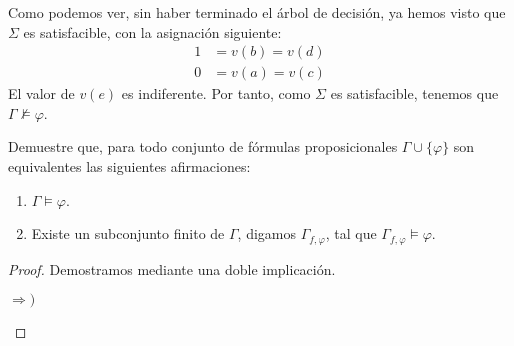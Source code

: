 \documentclass[12pt]{article}
\begin{document}
\begin{ejercicio}
    Como podemos ver, sin haber terminado el árbol de decisión, ya hemos visto que
    $\Sigma$ es satisfacible, con la asignación siguiente:
    \begin{align*}
        1 &= v(b) = v(d) \\
        0 &= v(a) = v(c)
    \end{align*}
    El valor de $v(e)$ es indiferente. Por tanto, como
    $\Sigma$ es satisfacible, tenemos que $\Gamma \not\models \varphi$.
\end{ejercicio}

\begin{ejercicio}
    Demuestre que, para todo conjunto de fórmulas proposicionales $\Gamma\cup \{\varphi\}$ son
    equivalentes las siguientes afirmaciones:
    \begin{enumerate}
        \item $\Gamma \models \varphi$.
        \item Existe un subconjunto finito de $\Gamma$, digamos $\Gamma_{f, \varphi}$, tal que $\Gamma_{f, \varphi} \models \varphi$.
    \end{enumerate}
    \begin{proof}
        Demostramos mediante una doble implicación.
        \begin{description}
            \item[$\Longrightarrow)$]
            \begin{comment}

            Demostraremos el recíproco. Supongamos que para todo subconjunto finito $\Gamma_{f, \varphi}\subset~\Gamma$ se tiene que $\Gamma_{f, \varphi} \not \models \varphi$,
            o equivalentemente, que $\Gamma_{f, \varphi} \cup \{\lnot \varphi\}$ es satisfacible.
            Es decir, supongamos que para todo subconjunto finito $\Gamma_{f, \varphi}\subset~\Gamma$, existe una asignación $v$ tal que $v_{\ast}(\Gamma_{f, \varphi} \cup \{\lnot \varphi\}) \subset \{1\}$.

            Buscamos ahora una asignación $v$ tal que $v_{\ast}(\Gamma \cup \{\lnot \varphi\}) \subset \{1\}$.
            Para cada $n\in \bb{N}$, $n\geq 1$, definimos $\Gamma_n = \{p_1, \ldots, p_n\}$, con $p_i\in \Gamma$ para todo $i\in \{1, \ldots, n\}$.
            Como $\Gamma_n \cup \{\lnot \varphi\}$ es finito, tenemos que existe una asignación $\wt{v}_n$ tal que se tiene $(\wt{v}_{n})_{\ast}(\Gamma_n \cup \{\lnot \varphi\}) \subset \{1\}$.


\end{comment}
\end{description}
\end{proof}
\end{ejercicio}
\end{document}
